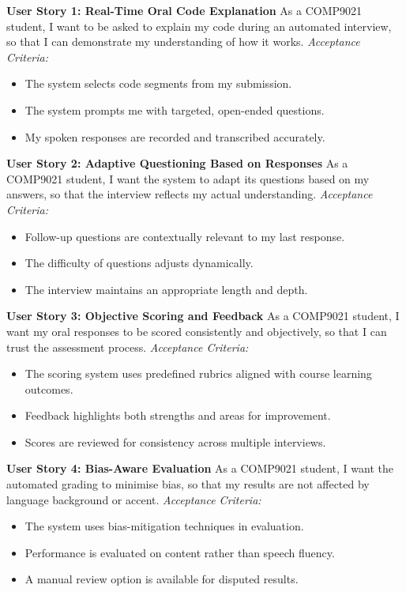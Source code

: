 \textbf{User Story 1: Real-Time Oral Code Explanation}  
As a COMP9021 student, I want to be asked to explain my code during an automated interview, so that I can demonstrate my understanding of how it works.  
\textit{Acceptance Criteria:}
\begin{itemize}
    \item The system selects code segments from my submission.
    \item The system prompts me with targeted, open-ended questions.
    \item My spoken responses are recorded and transcribed accurately.
\end{itemize}

\textbf{User Story 2: Adaptive Questioning Based on Responses}  
As a COMP9021 student, I want the system to adapt its questions based on my answers, so that the interview reflects my actual understanding.  
\textit{Acceptance Criteria:}
\begin{itemize}
    \item Follow-up questions are contextually relevant to my last response.
    \item The difficulty of questions adjusts dynamically.
    \item The interview maintains an appropriate length and depth.
\end{itemize}

\textbf{User Story 3: Objective Scoring and Feedback}  
As a COMP9021 student, I want my oral responses to be scored consistently and objectively, so that I can trust the assessment process.  
\textit{Acceptance Criteria:}
\begin{itemize}
    \item The scoring system uses predefined rubrics aligned with course learning outcomes.
    \item Feedback highlights both strengths and areas for improvement.
    \item Scores are reviewed for consistency across multiple interviews.
\end{itemize}

\textbf{User Story 4: Bias-Aware Evaluation}  
As a COMP9021 student, I want the automated grading to minimise bias, so that my results are not affected by language background or accent.  
\textit{Acceptance Criteria:}
\begin{itemize}
    \item The system uses bias-mitigation techniques in evaluation.
    \item Performance is evaluated on content rather than speech fluency.
    \item A manual review option is available for disputed results.
\end{itemize}

